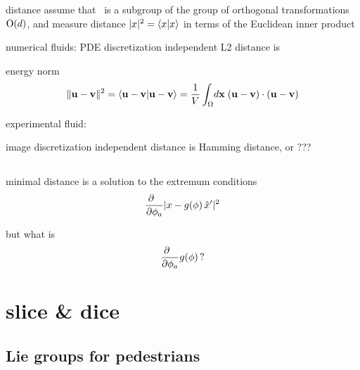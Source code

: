 \begin{frame}{distance}
assume that \Group\
is a subgroup of the group of orthogonal transformations
$\textrm{O}(d)$, and measure
distance $|\ssp|^2=\braket{\ssp}{\ssp}$ in terms of the Euclidean inner
product

\bigskip
numerical fluids:  PDE discretization independent L2 distance is
\begin{block}{energy norm}
\[
  \Norm{\bu-\bv}^2  = \braket{\bu-\bv}{\bu-\bv}  = \frac{1}{V}
                \int_\bCell \! d \bx \;
                       (\bu-\bv) \cdot (\bu-\bv)
\]
\end{block}

\bigskip
experimental fluid:
\begin{block}{image discretization independent distance}
 is Hamming distance, or ???
\end{block}
\end{frame}

\subsection{\mslices}

\begin{frame}{}
\begin{block}{minimal distance}
is a solution to the extremum conditions
\[ %
\frac{\partial ~~}{\partial \gSpace_a} |\ssp - \LieEl(\gSpace)\,\slicep|^2
\] %
\end{block}
\bigskip
but what is
\[
\frac{\partial ~~}{\partial {\bf \phi}_a} g({\bf \phi})
\,?
\]
\end{frame}

\section{slice \& dice}

\subsection[Lie groups]{Lie groups for pedestrians}

